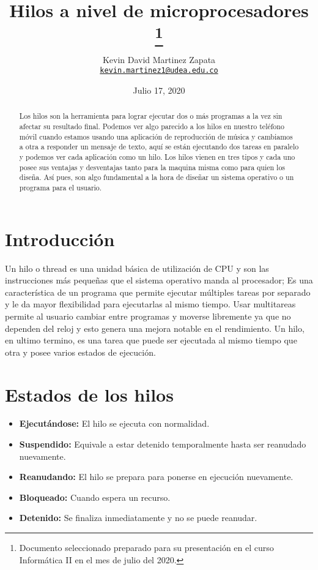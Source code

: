 \documentclass[11pt]{article}
\title{Hilos a nivel de microprocesadores
\thanks{Documento seleccionado preparado para su presentación en el curso Informática II en el mes de julio del 2020.}
}
\author{Kevin David Martinez Zapata\\%
    \href{mailto:kevin.martinez1@udea.edu.co}{\texttt{kevin.martinez1@udea.edu.co}}
    }
\date{Julio 17, 2020}
\begin{document}
\maketitle

\begin{abstract}
Los hilos son la herramienta para lograr ejecutar dos o más programas a la vez sin afectar su resultado final. Podemos ver algo parecido a los hilos en nuestro teléfono móvil cuando estamos usando una aplicación de reproducción de música y cambiamos a otra a responder un mensaje de texto, aquí se están ejecutando dos tareas en paralelo y podemos ver cada aplicación como un hilo. Los hilos vienen en tres tipos y cada uno posee sus ventajas y desventajas tanto para la maquina misma como para quien los diseña. Así pues, son algo fundamental a la hora de diseñar un sistema operativo o un programa para el usuario.
\end{abstract}

\section{Introducción}
Un hilo o thread es una unidad básica de utilización de CPU y son las instrucciones más pequeñas que el sistema operativo manda al procesador; Es una característica de un programa que permite ejecutar múltiples tareas por separado y le da mayor flexibilidad para ejecutarlas al mismo tiempo. Usar multitareas permite al usuario cambiar entre programas y moverse libremente ya que no dependen del reloj y esto genera una mejora notable en el rendimiento. Un hilo, en ultimo termino, es una tarea que puede ser ejecutada al mismo tiempo que otra y posee varios estados de ejecución.
\cite{Hilos1}

\section{Estados de los hilos}

\begin{itemize}
\item \textbf{Ejecutándose:} El hilo se ejecuta con normalidad.

\item \textbf{Suspendido:} Equivale a estar detenido temporalmente hasta ser reanudado nuevamente.

\item \textbf{Reanudando:} El hilo se prepara para ponerse en ejecución nuevamente.

\item \textbf{Bloqueado:} Cuando espera un recurso.

\item \textbf{Detenido:} Se finaliza inmediatamente y no se puede reanudar.

\end{itemize}
\end{document}
